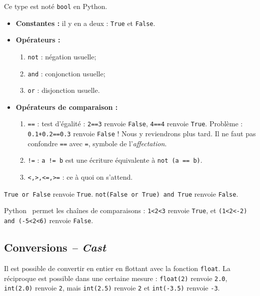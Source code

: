 \begin{defi}
Ce type est noté \texttt{bool} en Python.
\begin{itemize}
\item \textbf{Constantes :} il y en a deux : \texttt{True} et \texttt{False}.
\item \textbf{Opérateurs :}
\begin{enumerate}
 \item \texttt{not} : négation usuelle;
 \item \texttt{and} : conjonction usuelle;
 \item \texttt{or} : disjonction usuelle.
\end{enumerate}
\item \textbf{Opérateurs de comparaison :}
\begin{enumerate}
 \item \texttt{==} : test d'égalité : \texttt{2==3} renvoie \texttt{False}, \texttt{4==4} renvoie 
\texttt{True}. Problème : \texttt{0.1+0.2==0.3} renvoie \texttt{False} ! Nous y reviendrons plus 
tard. Il ne faut pas confondre \texttt{==} avec \texttt{=}, symbole de l'\emph{affectation}.
 \item \texttt{!=} : \texttt{a != b} est une écriture équivalente à \texttt{not (a == b)}.
 \item \texttt{<,>,<=,>=} : ce à quoi on s'attend.
\end{enumerate}
\end{itemize}
\end{defi}


\begin{exemple}
\texttt{True or False} renvoie \texttt{True}. \texttt{not(False or True) and True} renvoie \texttt{False}.
\end{exemple}

\begin{rem}
Python \ permet les chaînes de comparaisons : \texttt{1<2<3} renvoie
\texttt{True}, et \texttt{(1<2<-2) and (-5<2<6)} renvoie \texttt{False}.
\end{rem}

\subsection{Conversions \textit{-- Cast}}

Il est possible de convertir en entier en flottant avec la fonction \texttt{float}. La réciproque est possible dans une certaine 
mesure : \texttt{float(2)} renvoie \texttt{2.0}, \texttt{int(2.0)} renvoie \texttt{2}, mais \texttt{int(2.5)} renvoie \texttt{2} et 
\texttt{int(-3.5)} renvoie \texttt{-3}.

